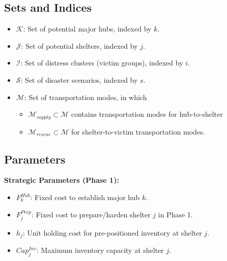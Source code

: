 \subsection*{Sets and Indices}
\begin{itemize}
    \item $\mathcal{K}$: Set of potential major hubs, indexed by $k$.
    \item $\mathcal{J}$: Set of potential shelters, indexed by $j$.
    \item $\mathcal{I}$: Set of distress clusters (victim groups), indexed by $i$.
    \item $\mathcal{S}$: Set of disaster scenarios, indexed by $s$.
    \item $\mathcal{M}$: Set of transportation modes, in which 
    \begin{itemize}
        \item $\mathcal{M}_{supply} \subset \mathcal{M}$ contains transportation modes for hub-to-shelter
        \item $\mathcal{M}_{rescue} \subset \mathcal{M} $ for shelter-to-victim transportation modes.
    \end{itemize}
\end{itemize}

\subsection*{Parameters}
\noindent \textbf{Strategic Parameters (Phase 1):}
\begin{itemize}
    \item $F_k^{Hub}$: Fixed cost to establish major hub $k$.
    \item $F_j^{Prep}$: Fixed cost to prepare/harden shelter $j$ in Phase 1.
    \item $h_j$: Unit holding cost for pre-positioned inventory at shelter $j$.
    \item $Cap_j^{Inv}$: Maximum inventory capacity at shelter $j$.
\end{itemize}

